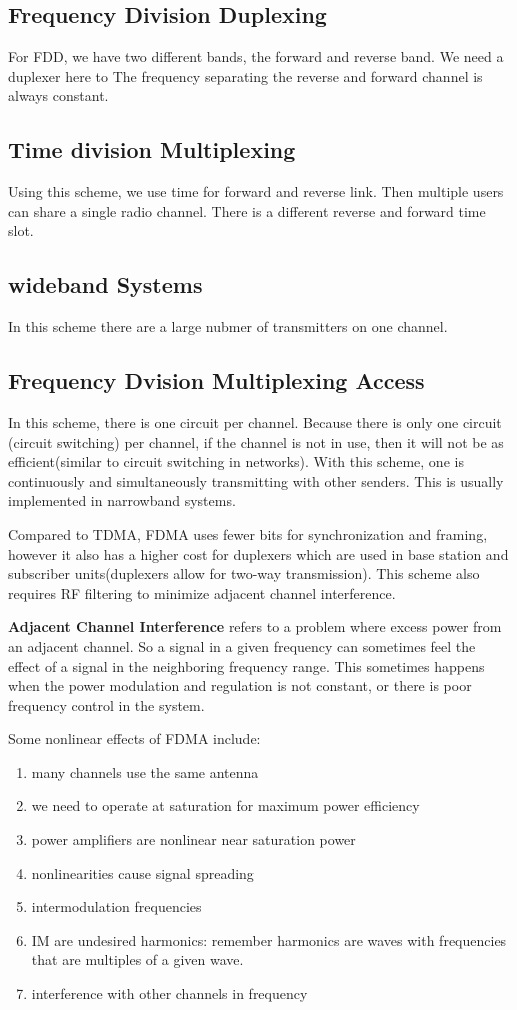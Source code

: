 \documentclass{article}
\begin{document}
\subsection{Frequency Division Duplexing}
For FDD, we have two different bands, the forward and reverse band. We need a duplexer here to The 
frequency separating the reverse and forward channel is always constant.
\subsection{Time division Multiplexing}
Using this scheme, we use time for forward and reverse link. Then multiple users can share a single
radio channel. There is a different reverse and forward time slot.

\subsection{wideband Systems}
In this scheme there are a large nubmer of transmitters on one channel. 
\subsection{Frequency Dvision Multiplexing Access}
In this scheme, there is one circuit per channel. Because there is only one circuit (circuit switching)
per channel, if the channel is not in use, then it will not be as efficient(similar to circuit switching
in networks). With this scheme, one is continuously and simultaneously transmitting with other senders.
This is usually implemented in narrowband systems.

Compared to TDMA, FDMA uses fewer bits for synchronization and framing, however it also has a higher 
cost for duplexers which are used in base station and subscriber units(duplexers allow for two-way
transmission). This scheme also requires RF filtering to minimize adjacent channel interference.

\textbf{Adjacent Channel Interference} refers to a problem where excess power from an adjacent channel.
So a signal in a given frequency can sometimes feel the effect of a signal in the neighboring 
frequency range. This sometimes happens when the power modulation and regulation is not constant, or 
there is poor frequency control in the system.

Some nonlinear effects of FDMA include:
\begin{enumerate}
		\item{many channels use the same antenna}
		\item{we need to operate at saturation for maximum power efficiency}
		\item{power amplifiers are nonlinear near saturation power}
		\item{nonlinearities cause signal spreading}
		\item{intermodulation frequencies}
		\item{IM are undesired harmonics}: remember harmonics are waves with frequencies that are multiples
				of a given wave.
		\item{interference with other channels in frequency}
\end{enumerate}
\end{document}
